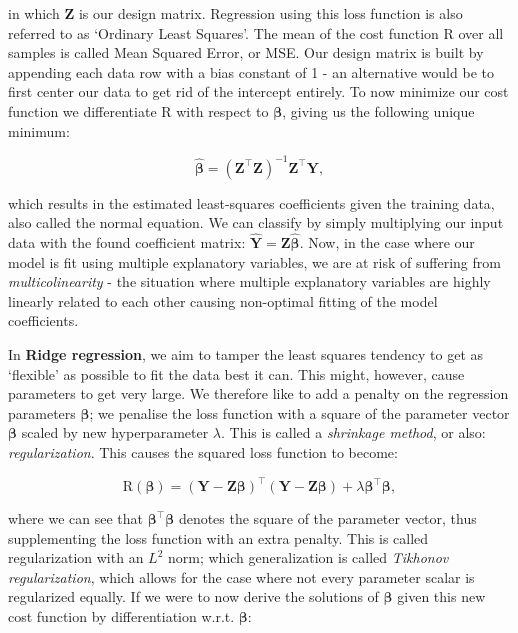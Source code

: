 \documentclass{article}
\begin{document}
in which $\mathbf{Z}$ is our design matrix. Regression using this loss function is also referred to as `Ordinary Least Squares'. The mean of the cost function $\text{R}$ over all samples is called Mean Squared Error, or MSE. Our design matrix is built by appending each data row with a bias constant of 1 - an alternative would be to first center our data to get rid of the intercept entirely. To now minimize our cost function we differentiate $\text{R}$ with respect to $\boldsymbol{\beta}$, giving us the following unique minimum:

\begin{equation}\hat{\boldsymbol{\beta}} = (\mathbf{Z}^\intercal \mathbf{Z})^{-1} \mathbf{Z}^\intercal \mathbf{Y},\end{equation}

which results in the estimated least-squares coefficients given the training data, also called the normal equation. We can classify by simply multiplying our input data with the found coefficient matrix: $\hat{\mathbf{Y}} = \mathbf{Z} \hat{\boldsymbol{\beta}}$. Now, in the case where our model is fit using multiple explanatory variables, we are at risk of suffering from \textit{multicolinearity} - the situation where multiple explanatory variables are highly linearly related to each other causing non-optimal fitting of the model coefficients.

In \textbf{Ridge regression}, we aim to tamper the least squares tendency to get as `flexible' as possible to fit the data best it can. This might, however, cause parameters to get very large. We therefore like to add a penalty on the regression parameters $\boldsymbol{\beta}$; we penalise the loss function with a square of the parameter vector $\boldsymbol{\beta}$ scaled by new hyperparameter $\lambda$. This is called a \textit{shrinkage method}, or also: \textit{regularization}. This causes the squared loss function to become:

\begin{equation}\text{R}(\boldsymbol{\beta}) = (\mathbf{Y} - \mathbf{Z} \boldsymbol{\beta})^\intercal (\mathbf{Y} - \mathbf{Z} \boldsymbol{\beta})+\lambda \boldsymbol{\beta}^\intercal \boldsymbol{\beta},\end{equation}

where we can see that $\boldsymbol{\beta}^\intercal \boldsymbol{\beta}$ denotes the square of the parameter vector, thus supplementing the loss function with an extra penalty. This is called regularization with an $L^2$ norm; which generalization is called \textit{Tikhonov regularization}, which allows for the case where not every parameter scalar is regularized equally. If we were to now derive the solutions of $\boldsymbol{\beta}$ given this new cost function by differentiation w.r.t. $\boldsymbol{\beta}$:
\end{document}
